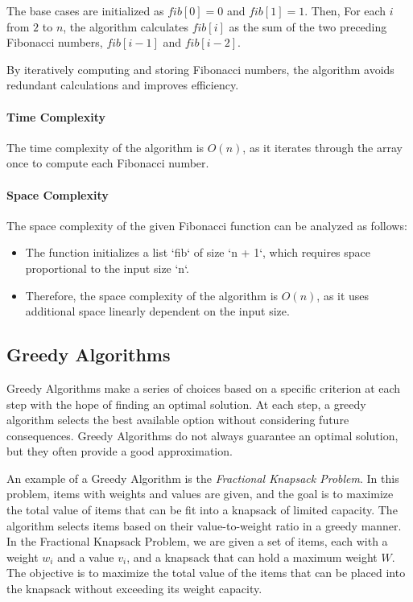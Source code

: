 \documentclass[12pt]{book} %
\begin{document}
The base cases are initialized as $fib[0] = 0$ and $fib[1] = 1$. Then, For each $i$ from $2$ to $n$, the algorithm calculates $fib[i]$ as the sum of the two preceding Fibonacci numbers, $fib[i-1]$ and $fib[i-2]$.

By iteratively computing and storing Fibonacci numbers, the algorithm avoids redundant calculations and improves efficiency.

\paragraph{Time Complexity}

The time complexity of the algorithm is $O(n)$, as it iterates through the array once to compute each Fibonacci number.
\paragraph{Space Complexity}
The space complexity of the given Fibonacci function can be analyzed as follows:

\begin{itemize}
    \item The function initializes a list `fib` of size `n + 1`, which requires space proportional to the input size `n`.
    \item Therefore, the space complexity of the algorithm is \(O(n)\), as it uses additional space linearly dependent on the input size.
\end{itemize}

\subsection{Greedy Algorithms}
Greedy Algorithms make a series of choices based on a specific criterion at each step with the hope of finding an optimal solution. At each step, a greedy algorithm selects the best available option without considering future consequences. Greedy Algorithms do not always guarantee an optimal solution, but they often provide a good approximation.

An example of a Greedy Algorithm is the \textit{Fractional Knapsack Problem}. In this problem, items with weights and values are given, and the goal is to maximize the total value of items that can be fit into a knapsack of limited capacity. The algorithm selects items based on their value-to-weight ratio in a greedy manner.
In the Fractional Knapsack Problem, we are given a set of items, each with a weight $w_i$ and a value $v_i$, and a knapsack that can hold a maximum weight $W$. The objective is to maximize the total value of the items that can be placed into the knapsack without exceeding its weight capacity.
\end{document}
